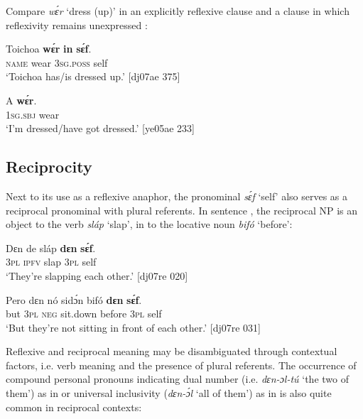 Compare \textit{wɛ́r} ‘dress (up)’ in an explicitly reflexive clause  and a clause in which reflexivity remains unexpressed : 



\ea%
    \label{ex:key:1230}
    \gll Toichoa    \textbf{wɛ́r}    \textbf{in}    \textbf{sɛ́f}.\\
\textsc{name}    wear  \textsc{3sg.poss}  self\\

\glt ‘Toichoa has/is dressed up.’ [dj07ae 375]
\z


\ea%
    \label{ex:key:1231}
    \gll A    \textbf{wɛ́r}.\\
\textsc{1sg.sbj}  wear\\

\glt ‘I’m dressed/have got dressed.’ [ye05ae 233]
\z

\subsection{Reciprocity}\label{sec:9.3.6}

Next to its use as a reflexive anaphor, the pronominal \textit{sɛ́f} ‘self’ also serves as a reciprocal pronominal with plural referents. In sentence , the reciprocal NP is an object to the verb \textit{sláp} ‘slap’, in  to the locative noun \textit{bifó} ‘before’:


\ea%
    \label{ex:key:1232}
    \gll Dɛn  de  sláp  \textbf{dɛn}  \textbf{sɛ́f}.\\
\textsc{3pl}  \textsc{ipfv}  slap  \textsc{3pl}  self\\

\glt ‘They’re slapping each other.’ [dj07re 020]
\z


\ea%
    \label{ex:key:1233}
    \gll Pero    dɛn  nó  sidɔ́n  bifó    \textbf{dɛn}  \textbf{sɛ́f}.\\
but    \textsc{3pl}  \textsc{neg}  sit.down  before  \textsc{3pl}  self\\

\glt ‘But they’re not sitting in front of each other.’ [dj07re 031]
\z

Reflexive and reciprocal meaning may be disambiguated through contextual factors, i.e. verb meaning and the presence of plural referents. The occurrence of compound personal pronouns indicating dual number (i.e. \textit{dɛn-ɔl-tú} ‘the two of them’) as in  or universal inclusivity (\textit{dɛn-ɔ́l} ‘all of them’) as in  is also quite common in reciprocal contexts: 


